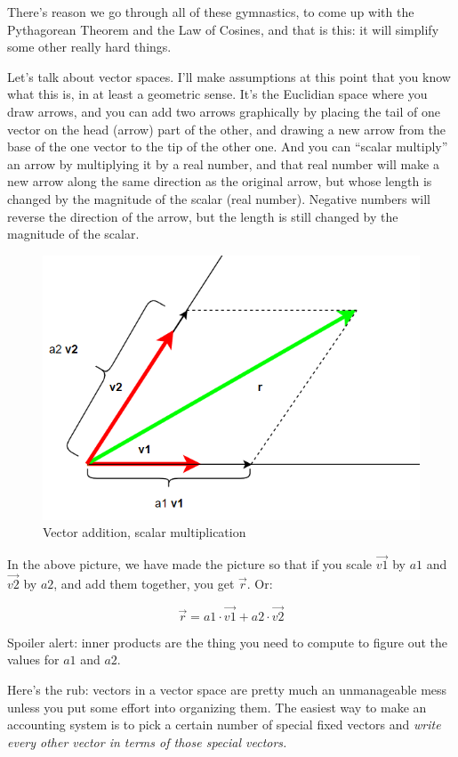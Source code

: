 \documentclass[
]{book}
\begin{document}
There's reason we go through all of these gymnastics, to come up with the Pythagorean Theorem and the Law of Cosines, and that is this: it will simplify some other really hard things.

Let's talk about vector spaces. I'll make assumptions at this point that you know what this is, in at least a geometric sense. It's the Euclidian space where you draw arrows, and you can add two arrows graphically by placing the tail of one vector on the head (arrow) part of the other, and drawing a new arrow from the base of the one vector to the tip of the other one. And you can ``scalar multiply'' an arrow by multiplying it by a real number, and that real number will make a new arrow along the same direction as the original arrow, but whose length is changed by the magnitude of the scalar (real number). Negative numbers will reverse the direction of the arrow, but the length is still changed by the magnitude of the scalar.

\begin{figure}

{\centering \includegraphics[width=0.75\linewidth,height=0.75\textheight]{images/parallelogram-decomposition} 

}

\caption{Vector addition, scalar multiplication}\label{fig:unnamed-chunk-4}
\end{figure}

In the above picture, we have made the picture so that if you scale \(\vec{v1}\) by \(a1\) and \(\vec{v2}\) by \(a2\), and add them together, you get \(\vec{r}\). Or:

\[\vec{r} = a1\cdot\vec{v1} + a2\cdot\vec{v2}\]

Spoiler alert: inner products are the thing you need to compute to figure out the values for \(a1\) and \(a2\).

Here's the rub: vectors in a vector space are pretty much an unmanageable mess unless you put some effort into organizing them. The easiest way to make an accounting system is to pick a certain number of special fixed vectors and \emph{write every other vector in terms of those special vectors.}
\end{document}
